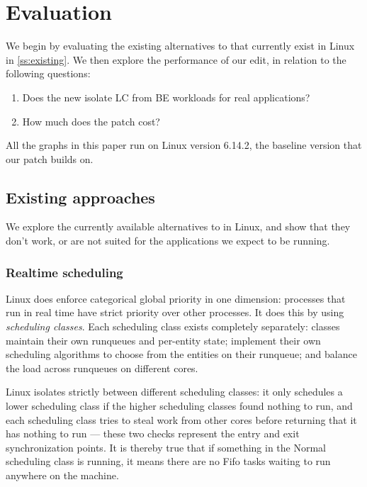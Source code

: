 \section{Evaluation}
\label{s:eval}

We begin by evaluating the existing alternatives to \cgroups{} that currently
exist in Linux in \autoref{ss:existing}. We then explore the performance of our
edit, in relation to the following questions:
\begin{enumerate}
    \item Does the new \schedbe{} isolate LC from BE workloads for real
    applications?
    \item How much does the patch cost?
\end{enumerate}

All the graphs in this paper run on Linux version 6.14.2, the baseline version
that our patch builds on.

\subsection{Existing approaches}\label{ss:existing}

We explore the currently available alternatives to \cgroups{} in Linux, and show
that they don't work, or are not suited for the applications we expect to be
running.

\subsubsection{Realtime scheduling}

Linux does enforce categorical global priority in one dimension: processes that
run in real time have strict priority over other processes. It does this by
using \textit{scheduling classes}. Each scheduling class exists completely
separately: classes maintain their own runqueues and per-entity state; implement
their own scheduling algorithms to choose from the entities on their runqueue;
and balance the load across runqueues on different cores.

Linux isolates strictly between different scheduling classes: it only schedules
a lower scheduling class if the higher scheduling classes found nothing to run,
and each scheduling class tries to steal work from other cores before returning
that it has nothing to run --- these two checks represent the entry and exit
synchronization points. It is thereby true that if something in the Normal
scheduling class is running, it means there are no Fifo tasks waiting to run
anywhere on the machine.

